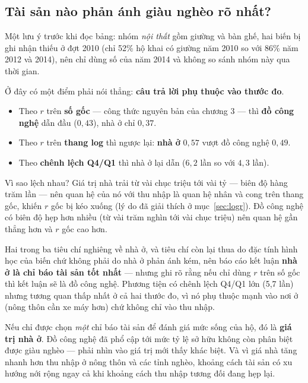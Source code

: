 \documentclass[11pt,a4paper]{article}
\newcommand{\n}[1]{\textbf{#1}}
\newcommand{\tblfit}[1]{\resizebox{\linewidth}{!}{}}
\begin{document}
\subsection{Tài sản nào phản ánh giàu nghèo rõ nhất?}

\begin{table}[H]\centering\small
\caption{Tương quan giữa giá trị từng nhóm tài sản và thu nhập/người (thang log), năm 2014}
\tblfit{t_assets_r}
\end{table}

Một lưu ý trước khi đọc bảng: nhóm \emph{nội thất} gồm giường và bàn ghế, hai biến bị ghi nhận thiếu ở đợt 2010 (chỉ 52\% hộ khai có giường năm 2010 so với 86\% năm 2012 và 2014), nên chỉ dùng số của năm 2014 và không so sánh nhóm này qua thời gian.

Ở đây có một điểm phải nói thẳng: \n{câu trả lời phụ thuộc vào thước đo}.

\begin{itemize}[leftmargin=1.2em,itemsep=2pt,topsep=2pt]
\item Theo $r$ trên \n{số gốc} — công thức nguyên bản của chương 3 — thì \n{đồ công nghệ} dẫn đầu ($0{,}43$), nhà ở chỉ $0{,}37$.
\item Theo $r$ trên \n{thang log} thì ngược lại: \n{nhà ở} $0{,}57$ vượt đồ công nghệ $0{,}49$.
\item Theo \n{chênh lệch Q4/Q1} thì nhà ở lại dẫn ($6{,}2$ lần so với $4{,}3$ lần).
\end{itemize}

Vì sao lệch nhau? Giá trị nhà trải từ vài chục triệu tới vài tỷ — biên độ hàng trăm lần — nên quan hệ của nó với thu nhập là quan hệ nhân và cong trên thang gốc, khiến $r$ gốc bị kéo xuống (lý do đã giải thích ở mục~\ref{sec:logr}). Đồ công nghệ có biên độ hẹp hơn nhiều (từ vài trăm nghìn tới vài chục triệu) nên quan hệ gần thẳng hơn và $r$ gốc cao hơn.

Hai trong ba tiêu chí nghiêng về nhà ở, và tiêu chí còn lại thua do đặc tính hình học của biến chứ không phải do nhà ở phản ánh kém, nên báo cáo kết luận \n{nhà ở là chỉ báo tài sản tốt nhất} — nhưng ghi rõ rằng nếu chỉ dùng $r$ trên số gốc thì kết luận sẽ là đồ công nghệ. Phương tiện có chênh lệch Q4/Q1 lớn (5,7 lần) nhưng tương quan thấp nhất ở cả hai thước đo, vì nó phụ thuộc mạnh vào nơi ở (nông thôn cần xe máy hơn) chứ không chỉ vào thu nhập.

\begin{kl}
Nếu chỉ được chọn \emph{một} chỉ báo tài sản để đánh giá mức sống của hộ, đó là \n{giá trị nhà ở}. Đồ công nghệ đã phổ cập tới mức tỷ lệ sở hữu không còn phân biệt được giàu nghèo — phải nhìn vào giá trị mới thấy khác biệt. Và vì giá nhà tăng nhanh hơn thu nhập ở nông thôn và các tỉnh nghèo, khoảng cách tài sản có xu hướng nới rộng ngay cả khi khoảng cách thu nhập tương đối đang hẹp lại.
\end{kl}
\end{document}
